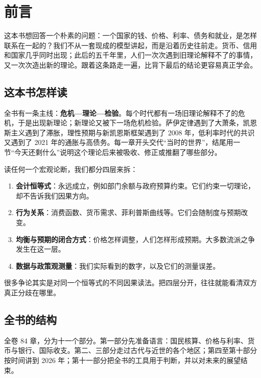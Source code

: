 \chapter*{前言}

这本书想回答一个朴素的问题：一个国家的钱、价格、利率、债务和就业，是怎样联系在一起的？我们不从一套现成的模型讲起，而是沿着历史往前走。货币、信用和国家几乎同时出现；此后的五千年里，人们一次次遇到旧理论解释不了的事情，又一次次造出新的理论。跟着这条路走一遍，比背下最后的结论更容易真正学会。

\section*{这本书怎样读}\label{front:howto}

全书有一条主线：\textbf{危机—理论—检验}。每个时代都有一场旧理论解释不了的危机，于是出现新理论；新理论又被下一场危机检验。萨伊定律遇到了大萧条，凯恩斯主义遇到了滞胀，理性预期与新凯恩斯框架遇到了 2008 年，低利率时代的共识又遇到了 2021 年的通胀与高债务。每一章开头交代“当时的世界”，结尾用一节“今天还剩什么”说明这个理论后来被吸收、修正或推翻了哪些部分。

读任何一个宏观论断，我们都分四层来拆：
\begin{enumerate}
\item \textbf{会计恒等式}：永远成立，例如部门余额与政府预算约束。它们约束一切理论，却不告诉我们因果方向。
\item \textbf{行为关系}：消费函数、货币需求、菲利普斯曲线等。它们会随制度与预期改变。
\item \textbf{均衡与预期的闭合方式}：价格怎样调整，人们怎样形成预期。大多数流派之争发生在这一层。
\item \textbf{数据与政策观测量}：我们实际看到的数字，以及它们的测量误差。
\end{enumerate}
很多争论其实是对同一个恒等式的不同因果读法。把四层分开，往往就能看清双方真正分歧在哪里。

\section*{全书的结构}\label{front:structure}

全卷 84 章，分为十一个部分。第一部分先准备语言：国民核算、价格与利率、货币与银行、国际收支。第二、三部分走过古代与近世的各个地区；第四至第十部分按时间讲到 2026 年；第十一部分把全书的工具用于判断，并以对未来的展望结束。


